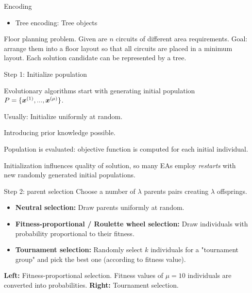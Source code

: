 \documentclass[11pt,compress,t,notes=noshow, xcolor=table]{beamer}
\begin{document}
\begin{framev}{Encoding}
\begin{itemize}
\item Tree encoding: Tree objects
\end{itemize}
\begin{small}
Floor planning problem. Given are $n$ circuits of different area requirements. Goal: arrange them into a floor layout so that all circuits are placed in a minimum layout. Each solution candidate can be represented by a tree.
\end{small}
\end{framev}


\begin{framei}{Step 1: Initialize population}
\item Evolutionary algorithms start with generating initial population $P = \{\bm{x}^{(1)}, ..., \bm{x}^{(\mu)}\}$.
\item Usually: Initialize uniformly at random.
\item Introducing prior knowledge possible.
\item Population is evaluated: objective function is computed for each initial individual.
\item Initialization influences quality of solution, so many EAs employ \textit{restarts} with new randomly generated initial populations.
\end{framei}


\begin{framev}[fs=small]{Step 2: parent selection}
Choose a number of $\lambda$ parents pairs creating $\lambda$ offsprings.
\begin{itemize}
\item \textbf{Neutral selection:} Draw parents uniformly at random.
\item \textbf{Fitness-proportional / Roulette wheel selection:} Draw individuals with probability proportional to their fitness.
\item \textbf{Tournament selection:} Randomly select $k$ individuals for a "tournament group" and pick the best one (according to fitness value).
\end{itemize}
\vfill
{}
\begin{footnotesize}\begin{center}
\textbf{Left:} Fitness-proportional selection.
Fitness values of $\mu = 10$ individuals are converted into probabilities.
\textbf{Right:} Tournament selection.
\end{center}\end{footnotesize}
\end{framev}
\end{document}
